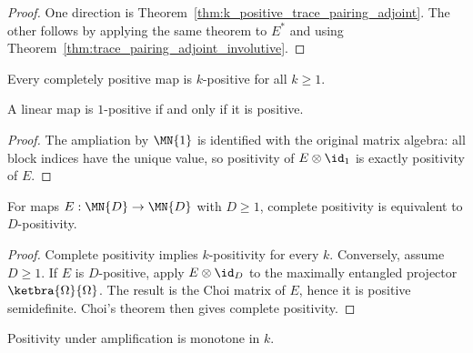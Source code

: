 \begin{proof}
    \leanok
    One direction is
    Theorem~\ref{thm:k_positive_trace_pairing_adjoint}. The other follows by
    applying the same theorem to $E^*$ and using
    Theorem~\ref{thm:trace_pairing_adjoint_involutive}.
\end{proof}

\begin{theorem}
    \label{thm:cp_implies_k_positive}
    \leanok
    Every completely positive map is $k$-positive for all $k \ge 1$.
\end{theorem}

\begin{theorem}
    \label{thm:one_positive_iff_positive}
    \leanok
    A linear map is $1$-positive if and only if it is positive.
\end{theorem}

\begin{proof}
    \leanok
    The ampliation by $\MN{1}$ is identified with the original matrix algebra:
    all block indices have the unique value, so positivity of
    $E\otimes\id_1$ is exactly positivity of $E$.
\end{proof}

\begin{theorem}
    \label{thm:d_positive_iff_completely_positive}
    \leanok
    For maps $E:\MN{D}\to\MN{D}$ with $D\ge 1$, complete positivity is
    equivalent to $D$-positivity.
\end{theorem}

\begin{proof}
    \leanok
    Complete positivity implies $k$-positivity for every $k$. Conversely,
    assume $D\ge 1$. If $E$ is $D$-positive, apply $E\otimes\id_D$ to the
    maximally entangled projector $\ketbra{\Omega}{\Omega}$. The result is
    the Choi matrix of $E$, hence it is positive semidefinite. Choi's theorem
    then gives complete positivity.
\end{proof}

\begin{theorem}
    \leanok
    Positivity under amplification is monotone in $k$.
\end{theorem}

